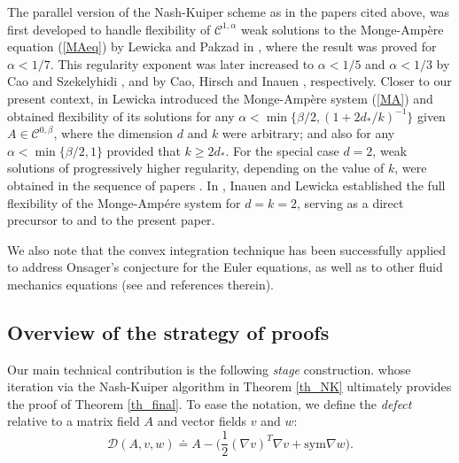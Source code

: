 \documentclass[reqno,twoside,11pt]{amsart}
\newcommand{\sym}{\mathrm{sym}}
\numberwithin{equation}{section}
\theoremstyle{plain}
\theoremstyle{definition}
\begin{document}
\medskip

\noindent The parallel version of the Nash-Kuiper scheme as in the papers
cited above, was first developed to handle 
flexibility of $\mathcal{C}^{1,\alpha}$ weak solutions to the 
Monge-Amp\`ere equation (\ref{MAeq}) by Lewicka and Pakzad in
\cite{lewpak_MA}, where the result was proved for
$\alpha<1/7$. This regularity exponent was later increased to
$\alpha<1/5$ and $\alpha<1/3$ by Cao and Szekelyhidi \cite{CS}, and
by Cao, Hirsch and Inauen \cite{CHI}, respectively. Closer to our present context,
in \cite{lew_conv} Lewicka introduced the Monge-Amp\`ere system
(\ref{MA}) and obtained flexibility of its solutions for any 
$\alpha<\min\{\beta/2, (1+2d_*/k)^{-1}\}$ given 
$A\in\mathcal{C}^{0,\beta}$, where the dimension $d$ and $k$ were arbitrary;
and also for any $\alpha<\min\{\beta/2, 1\}$ provided that $k\geq 2d_*$.
For the special case $d=2$, weak solutions of progressively higher
regularity, depending on the value of $k$, were obtained in the sequence of
papers \cite{lew_improved, lew_improved2, in_lew}. 
In \cite{in_lew2}, Inauen and Lewicka established the full flexibility
of the Monge-Amp\'ere system for $d=k=2$, serving as a direct precursor
to \cite{lew_conv} and to the present paper. 

\medskip

\noindent We also note that the convex integration technique has been
successfully applied to address Onsager’s conjecture for the Euler
equations, as well as to other fluid mechanics equations (see
\cite{BDSV, Isett, BV2021} and references therein). 

\medskip

\subsection{Overview of the strategy of proofs} \label{sub_over}

Our main technical contribution is the following {\em stage} construction.
whose iteration via the Nash-Kuiper algorithm in Theorem \ref{th_NK} ultimately provides the proof of Theorem \ref{th_final}. 
To ease the notation, we define the {\em defect}
relative to a matrix field $A$ and vector fields $v$ and $w$:
$$\mathcal{D}(A, v, w) \doteq A - \big(\frac{1}{2}(\nabla v)^T\nabla v +
\sym\nabla w\big).$$
 
\end{document}
